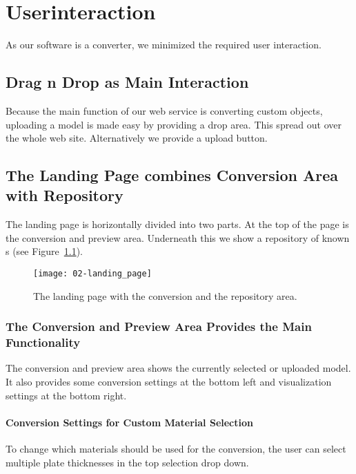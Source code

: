 \documentclass[../ClassicThesis.tex]{subfiles}
\begin{document}
\chapter{Userinteraction}\label{ch:userinteraction}

As our software is a converter, we minimized the required user interaction.

\section{Drag n Drop as Main Interaction}

Because the main function of our web service is converting custom objects, uploading a model is made easy by providing a drop area. This spread out over the whole web site. Alternatively we provide a upload button.

\section{The Landing Page combines Conversion Area with Repository}

The landing page is horizontally divided into two parts. At the top of the page is the conversion and preview area. Underneath this we show a repository of known \threedmodel s (see Figure~\ref{fig:landing_page}).

\begin{figure}
  \centering
  \texttt{[image: 02-landing\_page]}
  \caption{The landing page with the conversion and the repository area.}
  \label{fig:landing_page}
\end{figure}

\subsection{The Conversion and Preview Area Provides the Main Functionality}

The conversion and preview area shows the currently selected or uploaded model. It also provides some conversion settings at the bottom left and visualization settings at the bottom right.

\subsubsection{Conversion Settings for Custom Material Selection}

To change which materials should be used for the conversion, the user can select multiple plate thicknesses in the top selection drop down.
\end{document}
